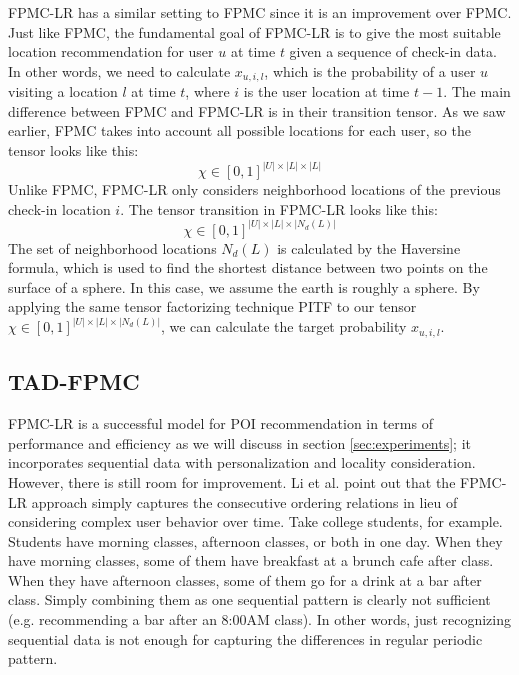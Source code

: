 \documentclass{sig-alternate}
\begin{document}
FPMC-LR has a similar setting to FPMC since it is an improvement 
over FPMC. Just like FPMC, the fundamental goal of FPMC-LR is to give the most suitable 
location recommendation for user $u$ at time $t$ given a sequence of check-in data. 
In other words, we need to calculate $x_{u,i,l}$, which is the probability of a user $u$ visiting a location $l$ at time $t$,
where $i$ is the user location at time $t-1$.
The main difference between FPMC and FPMC-LR is in their transition tensor. As we saw earlier, FPMC takes into account 
all possible locations for each user, so the tensor looks like this: 
\begin{equation}
	\chi \in [0, 1]^{|U| \times |L| \times |L|}
\label{eq:summation}
\end{equation}
Unlike FPMC, FPMC-LR only considers neighborhood locations of the previous check-in location $i$. 
The tensor transition in FPMC-LR looks like this:
\begin{equation}
	\chi \in [0, 1]^{|U| \times |L| \times |N_d(L)|}
\label{eq:summation}
\end{equation}
The set of neighborhood locations \begin{math}N_d(L)\end{math} is calculated by the Haversine formula, 
which is used to find the shortest distance between two points on the surface of a sphere. 
In this case, we assume the earth is roughly a sphere. By applying the same tensor factorizing technique PITF to 
our tensor $\chi \in [0, 1]^{|U| \times |L| \times |N_d(L)|}$, we can calculate the target probability $x_{u,i,l}$.

\subsection{TAD-FPMC}
\label{sec:typeChangesSpecialChars}

FPMC-LR is a successful model for POI recommendation in terms of performance and efficiency 
as we will discuss in section \ref{sec:experiments}; it incorporates sequential data with personalization and locality consideration. 
However, there is still room for improvement. Li et al. \cite{Li:2017} point out that the FPMC-LR approach simply captures 
the consecutive ordering relations in lieu of considering complex user behavior over time. Take college students, 
for example. Students have morning classes, afternoon classes, or both in one day. When they have morning classes, 
some of them have breakfast at a brunch cafe after class. When they have afternoon classes, some of them go 
for a drink at a bar after class. Simply combining them as one sequential pattern is clearly not sufficient (e.g. recommending a bar after an 8:00AM class). In other words, just recognizing sequential data is not 
enough for capturing the differences in regular periodic pattern.
\end{document}
